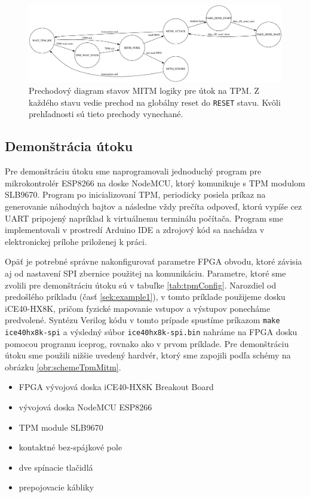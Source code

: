\begin{figure}
    \centerline{\includegraphics[width=1\textwidth]{images/misc/tpmMitmStateTransition.pdf}}
    \caption[Prechodový diagram stavov MITM logiky pre útok na TPM]{Prechodový diagram stavov MITM logiky pre útok na TPM. Z každého stavu vedie prechod na globálny reset do \texttt{RESET} stavu. Kvôli prehľadnosti sú tieto prechody vynechané.}
    \label{obr:tpmMitmStateTransition}
\end{figure}

\subsection{Demonštrácia útoku}
Pre demonštráciu útoku sme naprogramovali jednoduchý program pre mikrokontrolér ESP8266 na doske NodeMCU, ktorý komunikuje s TPM modulom SLB9670. Program po inicializovaní TPM, periodicky posiela príkaz na generovanie náhodných bajtov a následne vždy prečíta odpoveď, ktorú vypíše cez UART pripojený napríklad k virtuálnemu terminálu počítača. Program sme implementovali v prostredí Arduino IDE a zdrojový kód sa nachádza v elektronickej prílohe priloženej k práci.

Opäť je potrebné správne nakonfigurovať parametre FPGA obvodu, ktoré závisia aj od nastavení SPI zbernice použitej na komunikáciu. Parametre, ktoré sme zvolili pre demonštráciu útoku sú v tabuľke \ref{tab:tpmConfig}. Narozdiel od predošlého príkladu (časť \ref{sek:example1}), v tomto príklade použijeme dosku iCE40-HX8K, pričom fyzické mapovanie vstupov a výstupov ponecháme predvolené. Syntézu Verilog kódu v tomto prípade spustíme príkazom \texttt{make ice40hx8k-spi} a výsledný súbor \texttt{ice40hx8k-spi.bin} nahráme na FPGA dosku pomocou programu iceprog, rovnako ako v prvom príklade. Pre demonštráciu útoku sme použili nižšie uvedený hardvér, ktorý sme zapojili podľa schémy na obrázku \ref{obr:schemeTpmMitm}.
\begin{itemize}
    \item FPGA vývojová doska iCE40-HX8K Breakout Board
    \item vývojová doska NodeMCU ESP8266
    \item TPM module SLB9670
    \item kontaktné bez-spájkové pole
    \item dve spínacie tlačidlá
    \item prepojovacie kábliky
\end{itemize}

